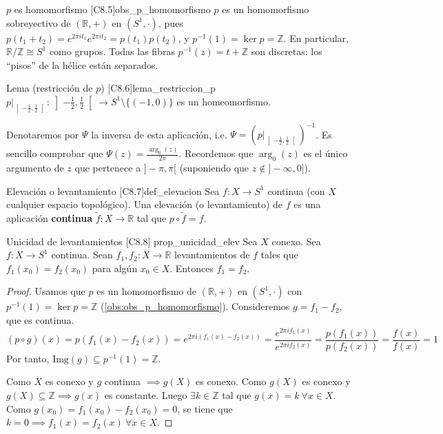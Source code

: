 \begin{observacion}{$p$ es homomorfismo [C8.5]}{obs_p_homomorfismo}
$p$ es un homomorfismo sobreyectivo de $(\mathbb{R},+)$ en $(S^1,\cdot)$, pues $p(t_1+t_2) = e^{2\pi i t_1} e^{2\pi i t_2} = p(t_1)p(t_2)$, y $p^{-1}(1) = \ker p = \mathbb{Z}$. En particular, $\mathbb{R}/\mathbb{Z} \cong S^1$ como grupos. Todas las fibras $p^{-1}(z) = t + \mathbb{Z}$ son discretas: los ``pisos'' de la hélice están separados.
\end{observacion}

\begin{proposicion}{Lema (restricción de $p$) [C8.6]}{lema_restriccion_p}
$p|_{\left]-\frac{1}{2}, \frac{1}{2}\right[} : \left]-\frac{1}{2}, \frac{1}{2}\right[ \to S^1 \setminus \{(-1,0)\}$ es un homeomorfismo.
\end{proposicion}

Denotaremos por $\Psi$ la inversa de esta aplicación, i.e. $\Psi = \left(p|_{\left]-\frac{1}{2}, \frac{1}{2}\right[}\right)^{-1}$.
Es sencillo comprobar que $\Psi(z) = \frac{\arg_0(z)}{2\pi}$.
Recordemos que $\arg_0(z)$ es el único argumento de $z$ que pertenece a $]-\pi, \pi[$ (suponiendo que $z \notin ]-\infty, 0]$).

\begin{definicion}{Elevación o levantamiento [C8.7]}{def_elevacion}
Sea $f: X \to S^1$ continua (con $X$ cualquier espacio topológico). Una elevación (o levantamiento) de $f$ es una aplicación \textbf{continua} $\tilde{f}: X \to \mathbb{R}$ tal que $p \circ \tilde{f} = f$.
\end{definicion}

\begin{proposicion}{Unicidad de levantamientos [C8.8] \marcaT}{prop_unicidad_elev}
Sea $X$ conexo. Sea $f: X \to S^1$ continua. Sean $f_1, f_2 : X \to \mathbb{R}$ levantamientos de $f$ tales que $f_1(x_0) = f_2(x_0)$ para algún $x_0 \in X$. Entonces $f_1 = f_2$.
\end{proposicion}

\begin{proof}
Usamos que $p$ es un homomorfismo de $(\mathbb{R},+)$ en $(S^1,\cdot)$ con $p^{-1}(1) = \ker p = \mathbb{Z}$ (\cref{obs:obs_p_homomorfismo}). Consideremos $g = f_1 - f_2$, que es continua.
\[ (p \circ g)(x) = p(f_1(x) - f_2(x)) = e^{2\pi i (f_1(x)-f_2(x))} = \frac{e^{2\pi i f_1(x)}}{e^{2\pi i f_2(x)}} = \frac{p(f_1(x))}{p(f_2(x))} = \frac{f(x)}{f(x)} = 1 \]
Por tanto, $\text{Img}(g) \subseteq p^{-1}(1) = \mathbb{Z}$.

Como $X$ es conexo y $g$ continua $\implies g(X)$ es conexo.
Como $g(X)$ es conexo y $g(X) \subseteq \mathbb{Z} \implies g(x)$ es constante.
Luego $\exists k \in \mathbb{Z}$ tal que $g(x) = k \ \forall x \in X$. Como $g(x_0) = f_1(x_0) - f_2(x_0) = 0$, se tiene que $k=0 \implies f_1(x) = f_2(x) \ \forall x \in X$.
\end{proof}

